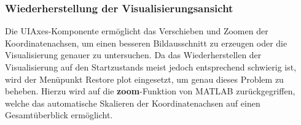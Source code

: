 \subsubsection{Wiederherstellung der Visualisierungsansicht}

Die UIAxes-Komponente ermöglicht das Verschieben und Zoomen der Koordinatenachsen, um einen besseren Bildausschnitt zu erzeugen oder die Visualisierung genauer zu untersuchen. Da das Wiederherstellen der Visualisierung auf den Startzustands meist jedoch entsprechend schwierig ist, wird der Menüpunkt \glqq Restore plot\grqq{} eingesetzt, um genau dieses Problem zu beheben. Hierzu wird auf die \textbf{zoom}-Funktion von MATLAB zurückgegriffen, welche das automatische Skalieren der Koordinatenachsen auf einen Gesamtüberblick ermöglicht.

\begin{minipage}{\linewidth}

\end{minipage}
